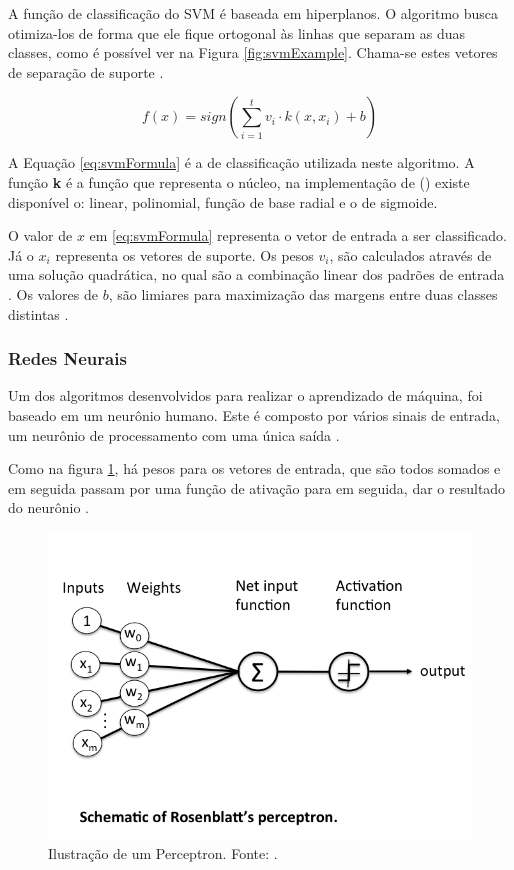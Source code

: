 A função de classificação do SVM é baseada em hiperplanos. O algoritmo busca otimiza-los de forma que ele fique ortogonal às linhas que separam as duas classes, como é possível ver na Figura \ref{fig:svmExample}. Chama-se estes vetores de separação de suporte \cite{SMOLA2004}.

\begin{equation} \label{eq:svmFormula}
	f(x) = sign(\sum_{i=1}^{t} v_i \cdot k(x, x_i) + b)
\end{equation}

A Equação \ref{eq:svmFormula} é a de classificação utilizada neste algoritmo. A função \textbf{k} é a função que representa o núcleo, na implementação de \citeauthor{PEDREGOSA2011} (\citeyear{PEDREGOSA2011}) existe disponível o: linear, polinomial, função de base radial e o de sigmoide.

O valor de $x$ em \ref{eq:svmFormula} representa o vetor de entrada a ser classificado. Já o $x_{i}$ representa os vetores de suporte. Os pesos $v_{i}$, são calculados através de uma solução quadrática, no qual são a combinação linear dos padrões de entrada \cite{SMOLA2004}. Os valores de $b$, são limiares para maximização das margens entre duas classes distintas \cite{HEARST1995}.

\subsubsection{Redes Neurais}

Um dos algoritmos desenvolvidos para realizar o aprendizado de máquina, foi baseado em um neurônio humano. Este é composto por vários sinais de entrada, um neurônio de processamento com uma única saída \cite{GOLDBERG2017}.

Como na figura \ref{fig:perceptron}, há pesos para os vetores de entrada, que são todos somados e em seguida passam por uma função de ativação para em seguida, dar o resultado do neurônio \cite{RASCHKA2015}.

\begin{figure}[h]
	\centering
    \includegraphics[keepaspectratio=true,scale=0.5]{figuras/perceptronSchematic}
	\caption[Ilustração Perceptron]{Ilustração de um Perceptron. Fonte: 
\cite{RASCHKA2015}.}
	\label{fig:perceptron}
\end{figure}

